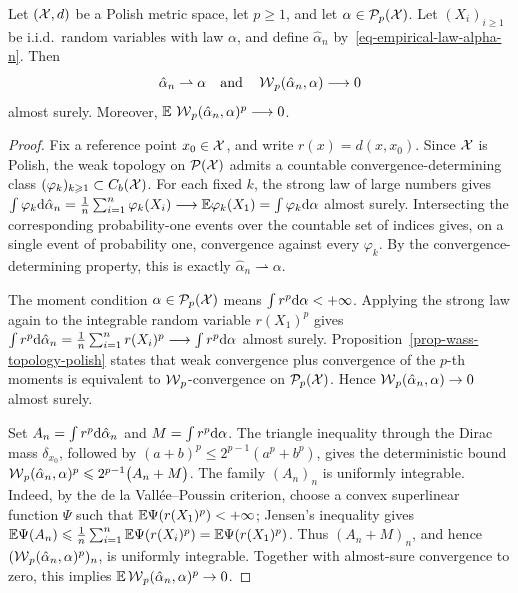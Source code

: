 \begin{prop}\label{prop-empirical-lln-wasserstein}
Let \((\mathcal{X},d)\) be a Polish metric space, let \(p\geq1\), and let \(\alpha\in\mathcal{P}_p(\mathcal{X})\). Let \((X_i)_{i\geq1}\) be i.i.d.\ random variables with law \(\alpha\), and define \(\hat\alpha_n\) by~\eqref{eq-empirical-law-alpha-n}. Then
\[
\hat\alpha_n\rightharpoonup\alpha
\quad \text{and} \quad
\operatorname{\mathcal{W}}_p(\hat\alpha_n,\alpha)\longrightarrow0
\]
almost surely. Moreover,
$\mathbb{E}\,\operatorname{\mathcal{W}}_p(\hat\alpha_n,\alpha)^p\longrightarrow0$.
\end{prop}
\begin{proof}
Fix a reference point \(x_0\in\mathcal{X}\), and write \(r(x)=d(x,x_0)\). Since \(\mathcal{X}\) is Polish, the weak topology on \(\mathcal{P}(\mathcal{X})\) admits a countable convergence-determining class \((\varphi_k)_{k\geqslant1}\subset C_b(\mathcal{X})\). For each fixed \(k\), the strong law of large numbers gives
$\int \varphi_k\mathrm{d}\hat\alpha_n = \frac1n\sum_{i=1}^n\varphi_k(X_i) \longrightarrow \mathbb{E}\varphi_k(X_1) = \int\varphi_k\mathrm{d}\alpha$
almost surely. Intersecting the corresponding probability-one events over the countable set of indices gives, on a single event of probability one, convergence against every \(\varphi_k\). By the convergence-determining property, this is exactly \(\hat\alpha_n\rightharpoonup\alpha\).

The moment condition \(\alpha\in\mathcal{P}_p(\mathcal{X})\) means \(\int r^p\mathrm{d}\alpha<+\infty\). Applying the strong law again to the integrable random variable \(r(X_1)^p\) gives
\(\int r^p\mathrm{d}\hat\alpha_n = \frac1n\sum_{i=1}^n r(X_i)^p \longrightarrow \int r^p\mathrm{d}\alpha\)
almost surely. Proposition~\ref{prop-wass-topology-polish} states that weak convergence plus convergence of the \(p\)-th moments is equivalent to \(\operatorname{\mathcal{W}}_p\)-convergence on \(\mathcal{P}_p(\mathcal{X})\). Hence \(\operatorname{\mathcal{W}}_p(\hat\alpha_n,\alpha)\to0\) almost surely.

Set \(A_n=\int r^p\mathrm{d}\hat\alpha_n\) and \(M=\int r^p\mathrm{d}\alpha\). The triangle inequality through the Dirac mass \(\delta_{x_0}\), followed by \((a+b)^p\leq2^{p-1}(a^p+b^p)\), gives the deterministic bound
$\operatorname{\mathcal{W}}_p(\hat\alpha_n,\alpha)^p \leqslant 2^{p-1}\big(A_n+M\big)$.
The family \((A_n)_n\) is uniformly integrable. Indeed, by the de la Vall\'ee--Poussin criterion, choose a convex superlinear function \(\Psi\) such that \(\mathbb{E}\Psi(r(X_1)^p)<+\infty\); Jensen's inequality gives
$\mathbb{E}\Psi(A_n) \leqslant \frac1n\sum_{i=1}^n \mathbb{E}\Psi(r(X_i)^p) = \mathbb{E}\Psi(r(X_1)^p)$.
Thus \((A_n+M)_n\), and hence \((\operatorname{\mathcal{W}}_p(\hat\alpha_n,\alpha)^p)_n\), is uniformly integrable. Together with almost-sure convergence to zero, this implies \(\mathbb{E}\operatorname{\mathcal{W}}_p(\hat\alpha_n,\alpha)^p\to0\).
\end{proof}
